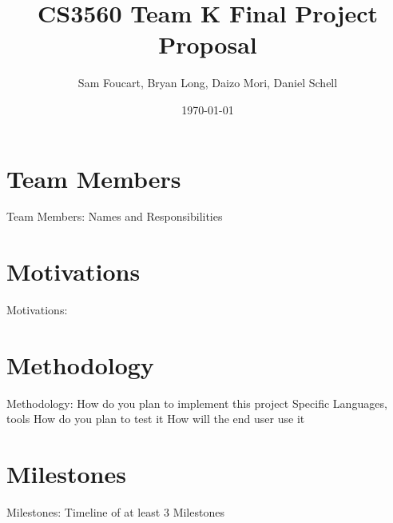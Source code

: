 \documentclass{article}
\title{CS3560 Team K Final Project Proposal}
\author{Sam Foucart, Bryan Long, Daizo Mori, Daniel Schell}
\date{\today}
\begin{document}
\maketitle

\section*{Team Members}

Team Members:
	Names and Responsibilities
	
\section*{Motivations}
	
Motivations:

\section*{Methodology}

Methodology:
	How do you plan to implement this project
		Specific Languages, tools
	How do you plan to test it
	How will the end user use it
	
\section*{Milestones}
	
Milestones:
	Timeline of at least 3 Milestones
\end{document}
